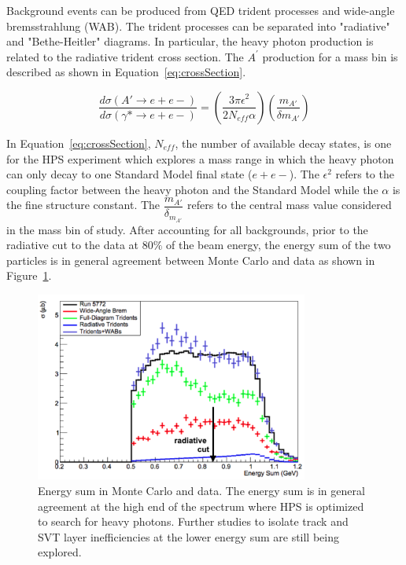 Background events can be produced from QED trident processes and wide-angle bremsstrahlung (WAB). The trident processes can be separated into "radiative" and "Bethe-Heitler" diagrams. In particular, the heavy photon production is related to the radiative trident cross section. The $A^{\prime}$ production for a mass bin is described as shown in Equation~\eqref{eq:crossSection}.

\begin{equation}
\label{eq:crossSection}
\dfrac{d\sigma(A'\rightarrow e+e-)}{d\sigma(\gamma*\rightarrow e+e-)} = \left(\dfrac{3\pi\epsilon^{2}}{2N_{eff}\alpha}\right)\left(\dfrac{m_{A'}}{\delta m_{A'}}\right)
\end{equation}

In Equation~\eqref{eq:crossSection}, $N_{eff}$, the number of available decay states, is one for the HPS experiment which explores a mass range in which the heavy photon can only decay to one Standard Model final state ($e+e-$). The $\epsilon^{2}$ refers to the coupling factor between the heavy photon and the Standard Model while the $\alpha$ is the fine structure constant. The $\dfrac{m_{A'}}{\delta_{m_{A'}}}$ refers to the central mass value considered in the mass bin of study. After accounting for all backgrounds, prior to the radiative cut to the data at 80$\%$ of the beam energy, the energy sum of the two particles is in general agreement between Monte Carlo and data as shown in Figure~\ref{fig:mcAgree}.

\begin{figure}[htb]
  \centering
      \includegraphics[width=0.8\textwidth]{pics/searching/mcAgree.png}
  \caption[Energy sum comparison in Monte Carlo and data]{Energy sum in Monte Carlo and data. The energy sum is in general agreement at the high end of the spectrum where HPS is optimized to search for heavy photons. Further studies to isolate track and SVT layer inefficiencies at the lower energy sum are still being explored.}
  \label{fig:mcAgree}
\end{figure} 

